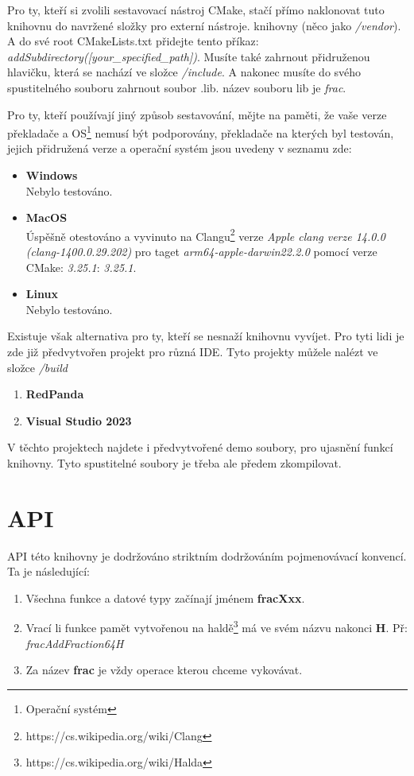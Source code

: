 \documentclass[a4paper, twocolumn, 11pt, twoside]{article}
\begin{document}
Pro ty, kteří si zvolili sestavovací nástroj CMake, stačí přímo
naklonovat tuto knihovnu do navržené složky pro externí nástroje.
knihovny (něco jako \textit{/vendor}). A do své 
root CMakeLists.txt přidejte tento příkaz: \textit{addSubdirectory([your\_specified\_path])}.
Musíte také zahrnout přidruženou hlavičku, která se nachází ve složce
\textit{/include}. A nakonec
musíte do svého spustitelného souboru zahrnout soubor .lib. název souboru
lib je \textit{frac}.

Pro ty, kteří používají jiný způsob sestavování, mějte na paměti, že
vaše verze překladače a OS\footnote{Operační systém} nemusí být podporovány, překladače 
na kterých byl testován, jejich přidružená verze a operační systém jsou uvedeny v seznamu
zde:
\begin{itemize}
\item \textbf{Windows}\\
Nebylo testováno.

\item \textbf{MacOS}\\
Úspěšně otestováno a vyvinuto na Clangu\footnote{https://cs.wikipedia.org/wiki/Clang}
verze \textit{Apple clang verze 14.0.0 (clang-1400.0.29.202)}
pro taget \textit{arm64-apple-darwin22.2.0} pomocí verze CMake:
\textit{3.25.1}: \textit{3.25.1}.

\item \textbf{Linux} \\
Nebylo testováno.

\end{itemize}

Existuje však alternativa pro ty, kteří se nesnaží
knihovnu vyvíjet. Pro tyti lidi je zde již předvytvořen
projekt pro různá IDE. Tyto projekty můžele nalézt ve 
složce \textit{/build}

\begin{enumerate}
    \item{\textbf{RedPanda}}
    \item{\textbf{Visual Studio 2023}}
\end{enumerate}

V těchto projektech najdete i předvytvořené demo soubory,
pro ujasnění funkcí knihovny. Tyto spustitelné soubory je
třeba ale předem zkompilovat.

\section{API}
API této knihovny je dodržováno striktním dodržováním
pojmenovávací konvencí. Ta je následující:
\begin{enumerate}
    \item Všechna funkce a datové typy začínají jménem
    \textbf{fracXxx}.
    \item Vrací li funkce pamět vytvořenou na haldě\footnote{https://cs.wikipedia.org/wiki/Halda}
    má ve svém názvu nakonci \textbf{H}. Př: \textit{fracAddFraction64H}
    \item Za název \textbf{frac} je vždy operace kterou chceme vykovávat.
\end{enumerate}
\end{document}
